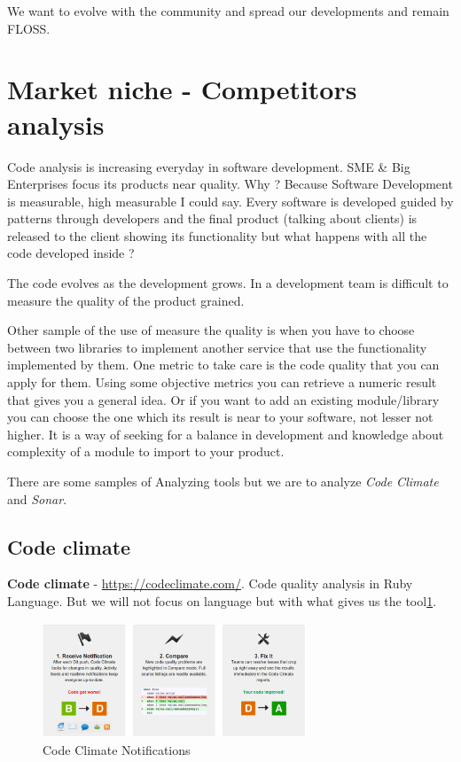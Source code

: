 \documentclass[11pt]{scrartcl}
\begin{document}
\par We want to evolve with the community and spread our developments and remain FLOSS.

\section{Market niche - Competitors analysis}
\label{sec:market-niche}

\par Code analysis is increasing everyday in software development. SME \& Big Enterprises focus its products near quality. Why ? Because Software Development is measurable, high measurable I could say. Every software is developed guided by patterns through developers and the final product (talking about clients) is released to the client showing its functionality but what happens with all the code developed inside ?

\par The code evolves as the development grows. In a development team is difficult to measure the quality of the product grained.

\par Other sample of the use of measure the quality is when you have to choose between two libraries to implement another service that use the functionality implemented by them. One metric to take care is the code quality that you can apply for them. Using some objective metrics you can retrieve a numeric result that gives you a general idea. Or if you want to add an existing module/library you can choose the one which its result is near to your software, not lesser not higher. It is a way of seeking for a balance in development and knowledge about complexity of a module to import to your product.

\par There are some samples of Analyzing tools but we are to analyze \emph{Code Climate} and \emph{Sonar}.

\subsection{Code climate}
\label{sub:code-climate}

\textbf{Code climate} - \url{https://codeclimate.com/}. Code quality analysis in Ruby Language. But we will not focus on language but with what gives us the tool\ref{code-climate}.

\begin{figure}[H]
\centering
\includegraphics[width=0.7\textwidth]{code-climate.png}
\caption{Code Climate Notifications}
\label{code-climate}
\end{figure}
\end{document}
